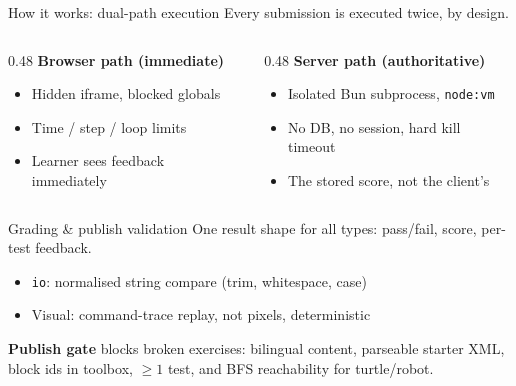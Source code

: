 \documentclass[11pt,t,usepdftitle=false,aspectratio=169]{beamer}
\begin{document}
\begin{frame}{How it works: dual-path execution}
  Every submission is executed twice, by design.
  \begin{columns}[T]
    \begin{column}{0.48\textwidth}
      \textbf{Browser path (immediate)}
      \begin{itemize}
        \item Hidden iframe, blocked globals
        \item Time / step / loop limits
        \item Learner sees feedback immediately
      \end{itemize}
    \end{column}
    \begin{column}{0.48\textwidth}
      \textbf{Server path (authoritative)}
      \begin{itemize}
        \item Isolated Bun subprocess, \texttt{node:vm}
        \item No DB, no session, hard kill timeout
        \item The stored score, not the client's
      \end{itemize}
    \end{column}
  \end{columns}
\end{frame}

\begin{frame}{Grading \& publish validation}
  One result shape for all types: pass/fail, score, per-test feedback.
  \begin{itemize}
    \item \texttt{io}: normalised string compare (trim, whitespace, case)
    \item Visual: command-trace replay, not pixels, deterministic
  \end{itemize}
  \vspace{0.3cm}
  \textbf{Publish gate} blocks broken exercises: bilingual content, parseable
  starter XML, block ids in toolbox, $\ge 1$ test, and BFS reachability for
  turtle/robot.
\end{frame}
\end{document}
